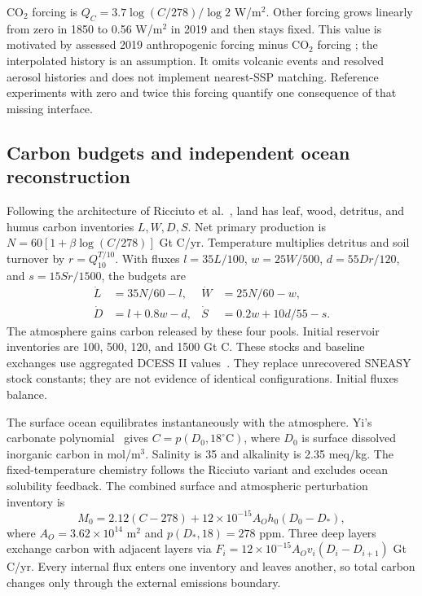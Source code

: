 \documentclass[11pt]{article}
\begin{document}
CO$_2$ forcing is $Q_C=3.7\log(C/278)/\log 2$ W/m$^2$. Other forcing grows
linearly from zero in 1850 to 0.56 W/m$^2$ in 2019 and then stays fixed. This
value is motivated by assessed 2019 anthropogenic forcing minus CO$_2$ forcing
\cite{ipcc}; the interpolated history is an assumption. It omits volcanic
events and resolved aerosol histories and does not implement nearest-SSP
matching. Reference experiments with zero and twice this forcing quantify
one consequence of that missing interface.

\subsection{Carbon budgets and independent ocean reconstruction}
Following the architecture of Ricciuto et al.\ \cite{ricciuto}, land has leaf,
wood, detritus, and humus carbon inventories $L,W,D,S$. Net primary production
is $N=60[1+\beta\log(C/278)]$ Gt C/yr. Temperature multiplies detritus and
soil turnover by $r=Q_{10}^{T/10}$. With fluxes
$l=35L/100$, $w=25W/500$, $d=55Dr/120$, and $s=15Sr/1500$, the budgets are
\begin{align}
\dot L&=35N/60-l,& \dot W&=25N/60-w,\\
\dot D&=l+0.8w-d,& \dot S&=0.2w+10d/55-s.
\end{align}
The atmosphere gains carbon released by these four pools. Initial reservoir
inventories are 100, 500, 120, and 1500 Gt C. These stocks and baseline exchanges
use aggregated DCESS II values\ \cite{dcess}. They replace unrecovered SNEASY stock constants;
they are not evidence of identical configurations. Initial fluxes balance.

The surface ocean equilibrates instantaneously with the atmosphere. Yi's
carbonate polynomial\ \cite{yi} gives $C=p(D_0,18^\circ\mathrm{C})$, where
$D_0$ is surface dissolved inorganic carbon in mol/m$^3$. Salinity is 35 and
alkalinity is 2.35 meq/kg. The fixed-temperature chemistry follows the
Ricciuto variant and excludes ocean solubility feedback. The combined surface
and atmospheric perturbation inventory is
\begin{equation}
M_0=2.12(C-278)+12\times10^{-15}A_Oh_0(D_0-D_*),
\end{equation}
where $A_O=3.62\times10^{14}$ m$^2$ and $p(D_*,18)=278$ ppm. Three deep layers
exchange carbon with adjacent layers via
$F_i=12\times10^{-15}A_Ov_i(D_i-D_{i+1})$ Gt C/yr.
Every internal flux enters one inventory and leaves another, so total carbon
changes only through the external emissions boundary.
\end{document}
